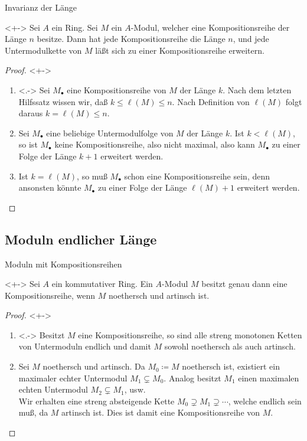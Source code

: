 \begin{frame}{Invarianz der Länge}
	\begin{proposition}<+->
		Sei \(A\) ein Ring. Sei \(M\) ein \(A\)-Modul, welcher eine Kompositionsreihe
		der Länge \(n\) besitze. Dann hat jede Kompositionsreihe die Länge \(n\),
		und jede Untermodulkette von \(M\) läßt sich zu einer Kompositionsreihe
		erweitern.
	\end{proposition}
	\begin{proof}<+->
		\begin{enumerate}[<+->]
		\item<.->
			Sei \(M_\bullet\) eine Kompositionsreihe von \(M\) der Länge \(k\).
			Nach dem letzten Hilfssatz wissen wir, daß \(k \le \ell(M) \leq n\). Nach
			Definition von \(\ell(M)\) folgt daraus \(k = \ell(M) \leq n\).
		\item
			Sei \(M_\bullet\) eine beliebige Untermodulfolge von \(M\) der Länge \(k\).
			Ist \(k < \ell(M)\), so ist \(M_\bullet\) keine Kompositionsreihe, also nicht
			maximal, also kann \(M_\bullet\) zu einer Folge der Länge \(k + 1\)
			erweitert werden.
		\item
			Ist \(k = \ell(M)\), so muß \(M_\bullet\) schon eine Kompositionsreihe sein,
			denn ansonsten könnte \(M_\bullet\) zu einer Folge der Länge
			\(\ell(M) + 1\) erweitert werden.
			\qedhere
		\end{enumerate}
	\end{proof}
\end{frame}

\subsection{Moduln endlicher Länge}

\begin{frame}{Moduln mit Kompositionsreihen}
	\begin{proposition}<+->
		Sei \(A\) ein kommutativer Ring. Ein \(A\)-Modul \(M\)
		besitzt genau dann eine Kompositionsreihe, wenn \(M\)
		noethersch und artinsch ist.
	\end{proposition}
	\begin{proof}<+->
		\begin{enumerate}[<+->]
		\item<.->
			Besitzt \(M\) eine Kompositionsreihe, so sind alle streng
			monotonen Ketten von Untermoduln endlich und damit \(M\)
			sowohl noethersch als auch artinsch.
		\item
			Sei \(M\) noethersch und artinsch. Da \(M_0 \coloneqq M\) noethersch
			ist, existiert ein maximaler echter Untermodul \(M_1 \subsetneq M_0\).
			Analog besitzt \(M_1\) einen maximalen echten Untermodul \(M_2 \subsetneq M_1\),
			usw.
			\\
			Wir erhalten eine streng absteigende Kette \(M_0 \supsetneq M_1
			\supsetneq \dotsb\), welche endlich sein muß, da \(M\) artinsch ist.
			Dies ist damit eine Kompositionsreihe von \(M\).
			\qedhere
		\end{enumerate}
	\end{proof}
\end{frame}

